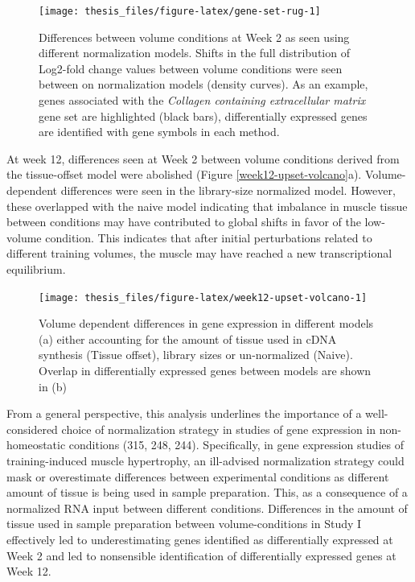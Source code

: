 \documentclass[twoside,10pt]{gihclass} %
\begin{document}
\begin{figure}

{\centering \texttt{[image: thesis\_files/figure-latex/gene-set-rug-1]} 

}

\caption[Global shifts in volume-dependent fold change as an effect of normalization methods at Week 2]{Differences between volume conditions at Week 2 as seen using different normalization models. Shifts in the full distribution of Log2-fold change values between volume conditions were seen between on normalization models (density curves). As an example, genes associated with the \textit{Collagen containing extracellular matrix} gene set are highlighted (black bars), differentially expressed genes are identified with gene symbols in each method.}\label{fig:gene-set-rug}
\end{figure}
At week 12, differences seen at Week 2 between volume conditions derived from the tissue-offset model were abolished (Figure \ref{week12-upset-volcano}a). Volume-dependent differences were seen in the library-size normalized model. However, these overlapped with the naive model indicating that imbalance in muscle tissue between conditions may have contributed to global shifts in favor of the low-volume condition. This indicates that after initial perturbations related to different training volumes, the muscle may have reached a new transcriptional equilibrium.
\begin{figure}

{\centering \texttt{[image: thesis\_files/figure-latex/week12-upset-volcano-1]} 

}

\caption[General patterns of differentially expressed genes at Week 12]{Volume dependent differences in gene expression in different models (a) either accounting for the amount of tissue used in cDNA synthesis (Tissue offset), library sizes or un-normalized (Naive). Overlap in differentially expressed genes between models are shown in (b)}\label{fig:week12-upset-volcano}
\end{figure}
From a general perspective, this analysis underlines the importance of a well-considered choice of normalization strategy in studies of gene expression in non-homeostatic conditions
(315, 248, 244).
Specifically, in gene expression studies of training-induced muscle hypertrophy, an ill-advised normalization strategy could mask or overestimate differences between experimental conditions as different amount of tissue is being used in sample preparation. This, as a consequence of a normalized RNA input between different conditions. Differences in the amount of tissue used in sample preparation between volume-conditions in Study I effectively led to underestimating genes identified as differentially expressed at Week 2 and led to nonsensible identification of differentially expressed genes at Week 12.
\end{document}
